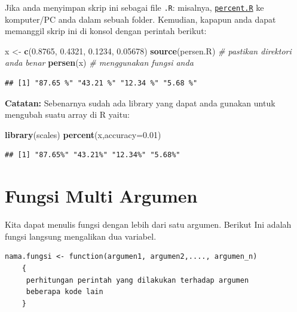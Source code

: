 \documentclass[
]{book}
\newenvironment{Shaded}{\begin{snugshade}}{\end{snugshade}}
\newcommand{\AttributeTok}[1]{\textcolor[rgb]{0.13,0.29,0.53}{#1}}
\newcommand{\CommentTok}[1]{\textcolor[rgb]{0.56,0.35,0.01}{\textit{#1}}}
\newcommand{\FloatTok}[1]{\textcolor[rgb]{0.00,0.00,0.81}{#1}}
\newcommand{\FunctionTok}[1]{\textcolor[rgb]{0.13,0.29,0.53}{\textbf{#1}}}
\newcommand{\NormalTok}[1]{#1}
\newcommand{\OtherTok}[1]{\textcolor[rgb]{0.56,0.35,0.01}{#1}}
\newcommand{\StringTok}[1]{\textcolor[rgb]{0.31,0.60,0.02}{#1}}
\begin{document}
Jika anda menyimpan skrip ini sebagai file \texttt{.R}: misalnya, \href{https://github.com/dsciencelabs/Algoritma_Pemrograman_R/blob/main/persen.R}{\texttt{percent.R}} ke komputer/PC anda dalam sebuah folder. Kemudian, kapapun anda dapat memanggil skrip ini di konsol dengan perintah berikut:

\begin{Shaded}
\begin{Highlighting}[]
\NormalTok{x }\OtherTok{\textless{}{-}} \FunctionTok{c}\NormalTok{(}\FloatTok{0.8765}\NormalTok{, }\FloatTok{0.4321}\NormalTok{, }\FloatTok{0.1234}\NormalTok{, }\FloatTok{0.05678}\NormalTok{)}
\FunctionTok{source}\NormalTok{(}\StringTok{\textquotesingle{}persen.R\textquotesingle{}}\NormalTok{)                   }\CommentTok{\# pastikan direktori anda benar}
\FunctionTok{persen}\NormalTok{(x)                                   }\CommentTok{\# menggunakan fungsi anda }
\end{Highlighting}
\end{Shaded}

\begin{verbatim}
## [1] "87.65 %" "43.21 %" "12.34 %" "5.68 %"
\end{verbatim}

\textbf{Catatan:} Sebenarnya sudah ada library yang dapat anda gunakan untuk mengubah suatu array di R yaitu:

\begin{Shaded}
\begin{Highlighting}[]
\FunctionTok{library}\NormalTok{(scales)}
\FunctionTok{percent}\NormalTok{(x,}\AttributeTok{accuracy=}\FloatTok{0.01}\NormalTok{)}
\end{Highlighting}
\end{Shaded}

\begin{verbatim}
## [1] "87.65%" "43.21%" "12.34%" "5.68%"
\end{verbatim}

\hypertarget{fungsi-multi-argumen}{%
\section{Fungsi Multi Argumen}\label{fungsi-multi-argumen}}

Kita dapat menulis fungsi dengan lebih dari satu argumen. Berikut Ini adalah fungsi langsung mengalikan dua variabel.

\begin{verbatim}
nama.fungsi <- function(argumen1, argumen2,...., argumen_n) 
    {
     perhitungan perintah yang dilakukan terhadap argumen
     beberapa kode lain
    }   
\end{verbatim}
\end{document}
